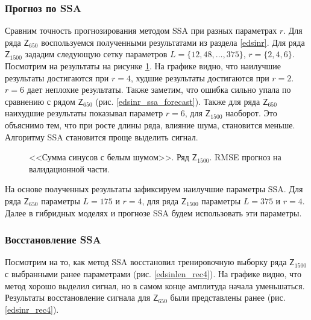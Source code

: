 \documentclass[specialist,
               substylefile = spbu.rtx,
               subf,href,colorlinks=true, 12p]{disser}
\begin{document}
\subsubsection{Прогноз по SSA}
Сравним точность прогнозирования методом SSA при разных параметрах $r$. Для ряда $\mathsf{Z}_{650}$ воспользуемся полученными результатами из раздела \ref{edsinr}. Для ряда $\mathsf{Z}_{1500}$ зададим следующую сетку параметров $L = \{12, 48, \ldots, 375\}$, $r = \{2, 4, 6\}$. Посмотрим на результаты на рисунке \ref{edsinlen_ssa_forecast}. На графике видно, что наилучшие результаты достигаются при $r = 4$, худшие результаты достигаются при $r = 2$. $r = 6$ дает неплохие результаты. Также заметим, что ошибка сильно упала по сравнению с рядом $\mathsf{Z}_{650}$ (рис. \ref{edsinr_ssa_forecast}). Также для ряда $\mathsf{Z}_{650}$  наихудшие результаты показывал параметр $r = 6$, для $\mathsf{Z}_{1500}$ наоборот. Это объяснимо тем, что при росте длины ряда, влияние шума, становится меньше. Алгоритму SSA становится проще выделить сигнал.

\begin{figure}[H]
	\captionsetup{justification=centering}
	\caption{<<Сумма синусов с белым шумом>>. Ряд $\mathsf{Z}_{1500}$. RMSE прогноз на валидационной части.}
	\label{edsinlen_ssa_forecast}
\end{figure}

На основе полученных результаты зафиксируем наилучшие параметры SSA. Для ряда $\mathsf{Z}_{650}$ параметры $L = 175$ и $r = 4$, для ряда $\mathsf{Z}_{1500}$ параметры $L = 375$ и $r = 4$. Далее в гибридных моделях и прогнозе SSA будем использовать эти параметры.

\subsubsection{Восстановление SSA}
Посмотрим на то, как метод SSA восстановил тренировочную выборку ряда $\mathsf{Z}_{1500}$ с выбранными ранее параметрами (рис. \ref{edsinlen_rec4}). На графике видно, что метод хорошо выделил сигнал, но в самом конце амплитуда начала уменьшаться. Результаты восстановление сигнала для $\mathsf{Z}_{650}$ были представлены ранее (рис. \ref{edsinr_rec4}).
\end{document}
